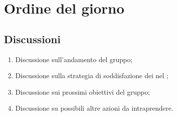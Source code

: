 \section{Ordine del giorno} 
\label{sec:agenda}
\subsection{Discussioni} 
\label{subsec:discussione}
\begin{enumerate}
    \item Discussione sull'andamento del gruppo;
    \item Discussione sulla strategia di soddisfazione dei  nel ;
    \item Discussione sui prossimi obiettivi del gruppo;
    \item Discussione su possibili altre azioni da intraprendere.
\end{enumerate}